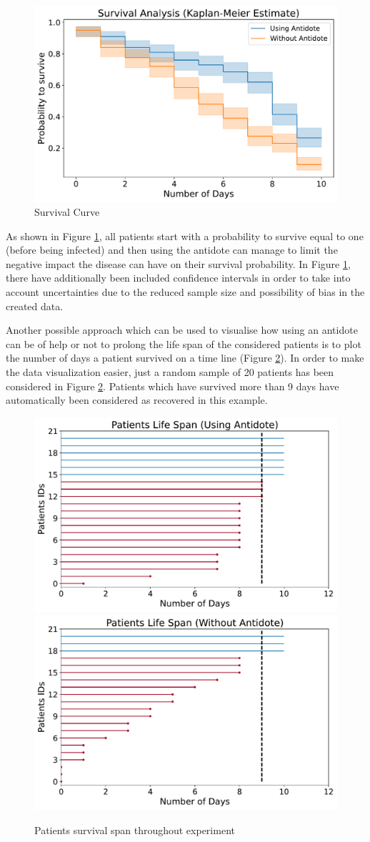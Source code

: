 \begin{figure}[ht!]%
    \centering
    \includegraphics[width=0.55\linewidth]{latex/images/survival.pdf}
    \vspace{-0.2cm}
    \caption{Survival Curve}
    \label{s_curve}
\end{figure}

As shown in Figure \ref{s_curve}, all patients start with a probability to survive equal to one (before being infected) and then using the antidote can manage to limit the negative impact the disease can have on their survival probability. In Figure \ref{s_curve}, there have additionally been included confidence intervals in order to take into account uncertainties due to the reduced sample size and possibility of bias in the created data.

Another possible approach which can be used to visualise how using an antidote can be of help or not to prolong the life span of the considered patients is to plot the number of days a patient survived on a time line (Figure \ref{span}). In order to make the data visualization easier, just a random sample of 20 patients has been considered in Figure \ref{span}. Patients which have survived more than 9 days have automatically been considered as recovered in this example.

\begin{figure}[ht!]%
    \centering
    \includegraphics[width=0.5\linewidth]{latex/images/survival_span.pdf}
    \includegraphics[width=0.49\linewidth]{latex/images/survival_span2.pdf}
    \vspace{-0.2cm}
    \caption{Patients survival span throughout experiment}
    \label{span}
\end{figure}

